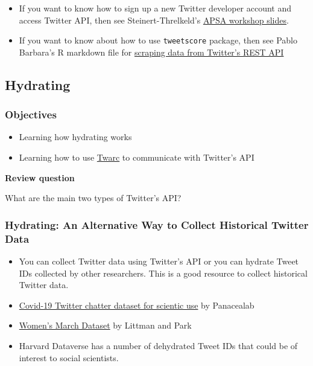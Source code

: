 \documentclass[
]{book}
\providecommand{\tightlist}{%
  \setlength{\itemsep}{0pt}\setlength{\parskip}{0pt}}
\begin{document}
\begin{itemize}
\item
  If you want to know how to sign up a new Twitter developer account and access Twitter API, then see Steinert-Threlkeld's \href{https://github.com/ZacharyST/APSA2020_EventDataFromSocialMedia/blob/master/Presentation/02_AccessTwitter.pdf}{APSA workshop slides}.
\item
  If you want to know about how to use \texttt{tweetscore} package, then see Pablo Barbara's R markdown file for \href{http://pablobarbera.com/social-media-workshop/code/02-twitter-REST-data-collection.html}{scraping data from Twitter's REST API}
\end{itemize}

\hypertarget{hydrating}{%
\subsection{Hydrating}\label{hydrating}}

\hypertarget{objectives-5}{%
\subsubsection{Objectives}\label{objectives-5}}

\begin{itemize}
\tightlist
\item
  Learning how hydrating works
\item
  Learning how to use \href{https://github.com/DocNow/twarc}{Twarc} to communicate with Twitter's API
\end{itemize}

\textbf{Review question}

What are the main two types of Twitter's API?

\hypertarget{hydrating-an-alternative-way-to-collect-historical-twitter-data}{%
\subsubsection{Hydrating: An Alternative Way to Collect Historical Twitter Data}\label{hydrating-an-alternative-way-to-collect-historical-twitter-data}}

\begin{itemize}
\item
  You can collect Twitter data using Twitter's API or you can hydrate Tweet IDs collected by other researchers. This is a good resource to collect historical Twitter data.
\item
  \href{http://www.panacealab.org/covid19/}{Covid-19 Twitter chatter dataset for scientic use} by Panacealab
\item
  \href{https://dataverse.harvard.edu/dataset.xhtml?persistentId=doi:10.7910/DVN/5ZVMOR}{Women's March Dataset} by Littman and Park
\item
  Harvard Dataverse has a number of dehydrated Tweet IDs that could be of interest to social scientists.
\end{itemize}
\end{document}
